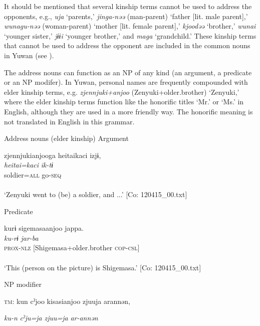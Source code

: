 It should be mentioned that several kinship terms cannot be used to address the opponents, e.g., \textit{uja} ‘parents,’ \textit{jinga-nəə} (man-parent) ‘father [lit. male parent],’ \textit{wunagu-nəə} (woman-parent) ‘mother [lit. female parent],’ \textit{kjoodəə} ‘brother,’ \textit{wunai} ‘younger sister,’ \textit{jɨɨi} ‘younger brother,’ and \textit{maga} ‘grandchild.’ These kinship terms that cannot be used to address the opponent are included in the common nouns in Yuwan (see ).

The address nouns can function as an NP of any kind (an argument, a predicate or an NP modifer). In Yuwan, personal names are frequently compounded with elder kinship terms, e.g. \textit{zjennjuki+anjoo} (Zenyuki+older.brother) ‘Zenyuki,’ where the elder kinship terms function like the honorific titles ‘Mr.’ or ‘Ms.’ in English, although they are used in a more friendly way. The honorific meaning is not translated in English in this grammar.

\ea \label{ex:7:6}  Address nouns (elder kinship)
\ea \label{ex:7:6a}Argument

\gllll  zjennjukianjooga  {\textbar}heitai{\textbar}kaci  izjɨ,\\
\textit{}  \textit{heitai=kaci}  \textit{ik-tɨ}\\
[Zenyuki+older.brother=\textsc{nom}]  soldier=\textsc{all}  go-\textsc{seq}\\
[Subject]    \\
\glt ‘Zenyuki went to (be) a soldier, and ...’ [Co: 120415\_00.txt]

\ex \label{ex:7:6b}Predicate

\gllll  kurɨ  sigemasaanjoo  jappa.\\
\textit{ku-rɨ}  \textit{}  \textit{jar-ba}\\
\textsc{prox}-\textsc{nlz}  [Shigemasa+older.brother  \textsc{cop}-\textsc{csl}]\\
[Nominal predicate]  \\
\glt ‘This (person on the picture) is Shigemasa.’ [Co: 120415\_00.txt]

\ex \label{ex:7:6c}NP modifier

    \textsc{tm}:  kun  cˀjoo  kisasianjoo  zjuuja  arannən,

      \textit{ku-n}  \textit{cˀju=ja}  \textit{}  \textit{zjuu=ja} \textit{ar-annən}
                                                                              
